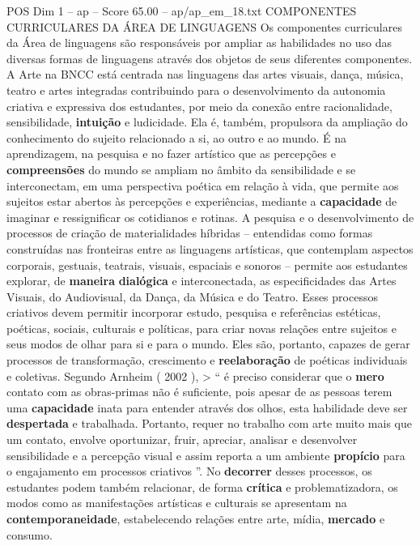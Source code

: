 \begin{textsample}{POS Dim 1 – ap – Score 65.00 – ap/ap\_em\_18.txt}  \label{ex:f1_pos_161}
COMPONENTES CURRICULARES DA ÁREA DE LINGUAGENS Os componentes curriculares da Área de linguagens são responsáveis por ampliar as habilidades no uso das diversas formas de linguagens através dos objetos de seus diferentes componentes.
A Arte na BNCC está centrada nas linguagens das artes visuais, dança, música, teatro e artes integradas contribuindo para o desenvolvimento da autonomia criativa e expressiva dos estudantes, por meio da conexão entre racionalidade, sensibilidade, \textbf{intuição} e ludicidade.
Ela é, também, propulsora da ampliação do conhecimento do sujeito relacionado a si, ao outro e ao mundo.
É na aprendizagem, na pesquisa e no fazer artístico que as percepções e \textbf{compreensões} do mundo se ampliam no âmbito da sensibilidade e se interconectam, em uma perspectiva poética em relação à vida, que permite aos sujeitos estar abertos às percepções e experiências, mediante a \textbf{capacidade} de imaginar e ressignificar os cotidianos e rotinas.
A pesquisa e o desenvolvimento de processos de criação de materialidades híbridas – entendidas como formas construídas nas fronteiras entre as linguagens artísticas, que contemplam aspectos corporais, gestuais, teatrais, visuais, espaciais e sonoros – permite aos estudantes explorar, de \textbf{maneira} \textbf{dialógica} e interconectada, as especificidades das Artes Visuais, do Audiovisual, da Dança, da Música e do Teatro.
Esses processos criativos devem permitir incorporar estudo, pesquisa e referências estéticas, poéticas, sociais, culturais e políticas, para criar novas relações entre sujeitos e seus modos de olhar para si e para o mundo.
Eles são, portanto, capazes de gerar processos de transformação, crescimento e \textbf{reelaboração} de poéticas individuais e coletivas.
Segundo Arnheim ( 2002 ), > “ é preciso considerar que o \textbf{mero} contato com as obras-primas não é suficiente, pois apesar de as pessoas terem uma \textbf{capacidade} inata para entender através dos olhos, esta habilidade deve ser \textbf{despertada} e trabalhada.
Portanto, requer no trabalho com arte muito mais que um contato, envolve oportunizar, fruir, apreciar, analisar e desenvolver sensibilidade e a percepção visual e assim reporta a um ambiente \textbf{propício} para o engajamento em processos criativos ”.
No \textbf{decorrer} desses processos, os estudantes podem também relacionar, de forma \textbf{crítica} e problematizadora, os modos como as manifestações artísticas e culturais se apresentam na \textbf{contemporaneidade}, estabelecendo relações entre arte, mídia, \textbf{mercado} e consumo.

\end{textsample}

